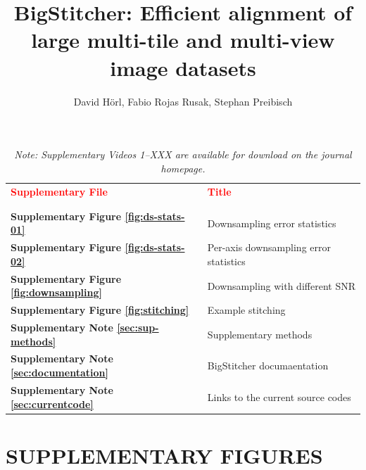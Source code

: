 \documentclass[]{spie}  %
\title{BigStitcher: Efficient alignment of large multi-tile and multi-view image datasets}
\author{David H{\"o}rl, Fabio Rojas Rusak, Stephan Preibisch
}
\newcommand\tablespace{\vspace{2.5mm}}
\begin{document}
\maketitle

\setcounter{page}{1}


\hspace{20mm}

\begin{table}[h!]
\center
{
\fontsize{12pt}{11pt}\selectfont
\center
\begin{tabular}{lp{11cm}}
\textbf{\textcolor{red}{Supplementary File}} & \textbf{\textcolor{red}{Title}}\\ \\
\hline
\\
\textbf{Supplementary Figure \ref{fig:ds-stats-01}} & Downsampling error statistics \tablespace \\
\textbf{Supplementary Figure \ref{fig:ds-stats-02}} & Per-axis downsampling error statistics \tablespace \\
\textbf{Supplementary Figure \ref{fig:downsampling}} &  Downsampling with different SNR \tablespace \\
\textbf{Supplementary Figure \ref{fig:stitching}} & Example stitching \tablespace \\
\textbf{Supplementary Note \ref{sec:sup-methods}} & Supplementary methods \tablespace \\
\textbf{Supplementary Note \ref{sec:documentation}} & BigStitcher documaentation \tablespace \\
\textbf{Supplementary Note \ref{sec:currentcode}} & Links to the current source codes \tablespace \\
\end{tabular}}
\caption{\emph{Note: Supplementary Videos 1--XXX are available for download on the journal homepage.}}
\end{table}

\pagebreak

\section*{SUPPLEMENTARY FIGURES}
\end{document}
